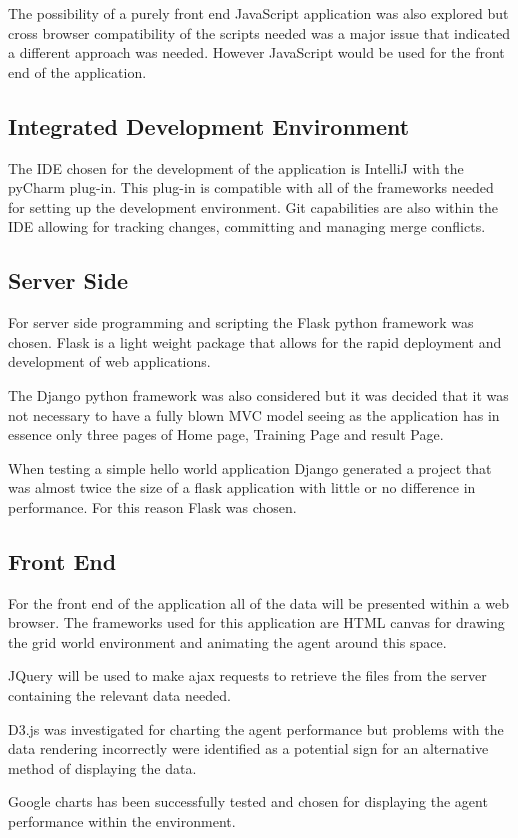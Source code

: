 The possibility of a purely front end JavaScript application was also explored but cross browser compatibility of the scripts needed was a major issue that indicated a different approach was needed. However JavaScript would be used for the front end of the application.

\subsection{Integrated Development Environment}
The IDE chosen for the development of the application is IntelliJ with the pyCharm plug-in. This plug-in is compatible with all of the frameworks needed for setting up the development environment. Git capabilities are also within the IDE allowing for tracking changes, committing and managing merge conflicts.  
\subsection{Server Side}
For server side programming and scripting the Flask python framework was chosen. Flask is a light weight package that allows for the rapid deployment and development of web applications.

The Django python framework was also considered but it was decided that it was not necessary to have a fully blown MVC model seeing as the application has in essence only three pages of Home page, Training Page and result Page.

When testing a simple hello world application Django generated a project that was almost twice the size of a flask application with little or no difference in performance.
For this reason Flask was chosen. 
\subsection{Front End}
For the front end of the application all of the data will be presented within a web browser. The frameworks used for this application are HTML canvas for drawing the grid world environment and animating the agent around this space.

JQuery will be used to make ajax requests to retrieve the files from the server containing the relevant data needed.

D3.js was investigated for charting the agent performance but problems with the data rendering incorrectly were identified as a potential sign for an alternative method of displaying the data.

Google charts has been successfully tested and chosen for displaying the agent performance within the environment.

